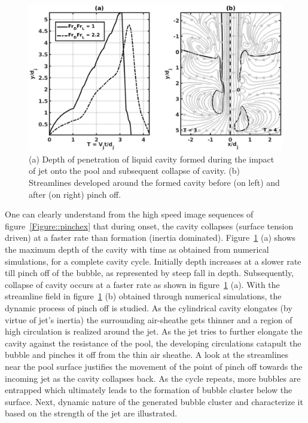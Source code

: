 \begin{figure}
	\centering
	\includegraphics[width=\linewidth]{chapters/jetPool/Figure11}
	\caption{(a) Depth of penetration of liquid cavity formed during the impact of jet onto the pool and subsequent collapse of cavity. (b) Streamlines developed around the formed cavity before (on left) and after (on right) pinch off.}
	\label{Figure::stream}
\end{figure}
One can clearly understand from the high speed image sequences of figure~\ref{Figure::pinchex} that during onset, the cavity collapses (surface tension driven) at a faster rate than formation (inertia dominated). Figure~\ref{Figure::stream} (a) shows the maximum depth of the cavity with time as obtained from numerical simulations, for a complete cavity cycle. Initially depth increases at a slower rate till pinch off of the bubble, as represented by steep fall in depth. Subsequently, collapse of cavity occurs at a faster rate as shown in figure~\ref{Figure::stream} (a). With the streamline field in figure~\ref{Figure::stream} (b) obtained through numerical simulations, the dynamic process of pinch off is studied. As the cylindrical cavity elongates (by virtue of jet's inertia) the surrounding air-sheathe gets thinner and a region of high circulation is realized around the jet. As the jet tries to further elongate the cavity against the resistance of the pool, the developing circulations catapult the bubble and pinches it off from the thin air sheathe. A look at the streamlines near the pool surface justifies the movement of the point of pinch off towards the incoming jet as the cavity collapses back. As the cycle repeats, more bubbles are entrapped which ultimately leads to the formation of bubble cluster below the surface. Next, dynamic nature of the generated bubble cluster and characterize it based on the strength of the jet are illustrated.

